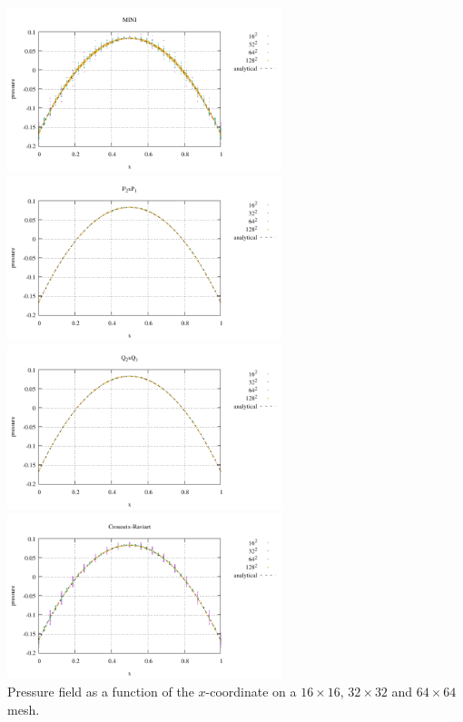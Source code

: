 \begin{center}
\includegraphics[width=8cm]{python_codes/fieldstone_112/results/exp1/pressMINI}
\includegraphics[width=8cm]{python_codes/fieldstone_112/results/exp1/pressP2P1}\\
\includegraphics[width=8cm]{python_codes/fieldstone_112/results/exp1/pressQ2Q1}
\includegraphics[width=8cm]{python_codes/fieldstone_112/results/exp1/pressCR}\\
{\captionfont Pressure field as a function of the $x$-coordinate on a $16\times16$,
$32\times 32$ and $64\times 64$ mesh.} 
\end{center}

